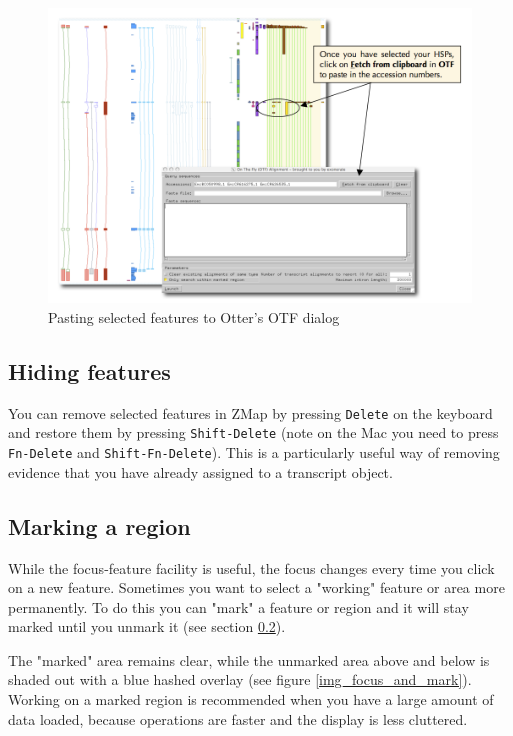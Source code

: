 \documentclass[letterpaper]{article}
\begin{document}
\begin{figure}
\centering
\color[rgb]{0.30980393,0.5058824,0.7411765}
\includegraphics[width=15.231cm]{img_show_hide.png}
\caption{Pasting selected features to Otter's OTF dialog}
\label{img_paste_features}
\end{figure}


\subsection{Hiding features}
You can remove selected features in ZMap by pressing \lstinline{Delete} on the keyboard and restore them by pressing \lstinline{Shift-Delete} (note on the Mac you need to press \lstinline{Fn-Delete} and \lstinline{Shift-Fn-Delete}). This is a particularly useful way of removing evidence that you have already assigned to a transcript object.


\subsection{Marking a region} \label{section_marking_a_region}
While the focus-feature facility is useful, the focus changes every time you click on a new feature. Sometimes you want to select a "working" feature or area more permanently. To do this you can "mark" a feature or region and it will stay marked until you unmark it (see section \ref{section_marking_a_region}).
 
The "marked" area remains clear, while the unmarked area above and below is shaded out with a blue hashed overlay (see figure \ref{img_focus_and_mark}). Working on a marked region is recommended when you have a large amount of data loaded, because operations are faster and the display is less cluttered.
\end{document}
